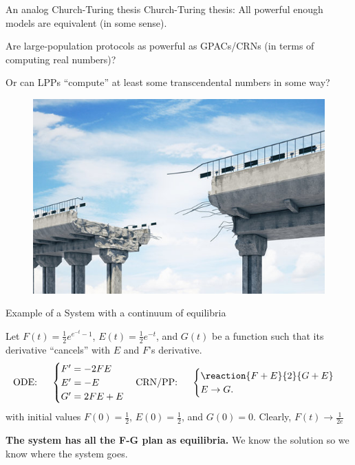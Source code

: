 \documentclass[aspectratio=169]{beamer}
\begin{document}
\begin{frame}{An analog Church-Turing thesis}%
Church-Turing thesis: All powerful enough models are equivalent (in some sense).
\begin{quest}
    Are large-population protocols as powerful as GPACs/CRNs (in terms of computing real numbers)?
\end{quest}
Or can LPPs ``compute'' at least some transcendental numbers in some way?
\end{frame}

\begin{frame}
    \begin{figure}[tb]
        \centering
        \includegraphics[scale=1.8]{bridge}
    \end{figure}
\end{frame}

\begin{frame}{Example of a System with a continuum of equilibria}
\begin{example}
   Let $F(t)= \frac{1}{2}e^{e^{-t} -1}$, $E(t)= \frac{1}{2}e^{-t}$, and $G(t)$ be a function such that its derivative ``cancels'' with $E$ and $F$'s derivative.
\begin{equation*}
\text{ODE:}\hspace{0.5cm}
       \begin{cases}
        F'= -2FE\\
        E'= -E \\
        G'= 2FE + E
   \end{cases}
\text{CRN/PP:} \hspace{0.5 cm}
\begin{cases}
    \reaction{F + E}{2}{G+E}\\
    E \to G.
   \end{cases}
\end{equation*}
with initial values $F(0)=\frac{1}{2}$, $E(0)=\frac{1}{2}$, and $G(0)=0$. Clearly, $F(t)\to \frac{1}{2e}$
\end{example}
\textbf{The system has all the F-G plan as equilibria.} We know the solution so we know where the system goes.
\end{frame}
\end{document}
